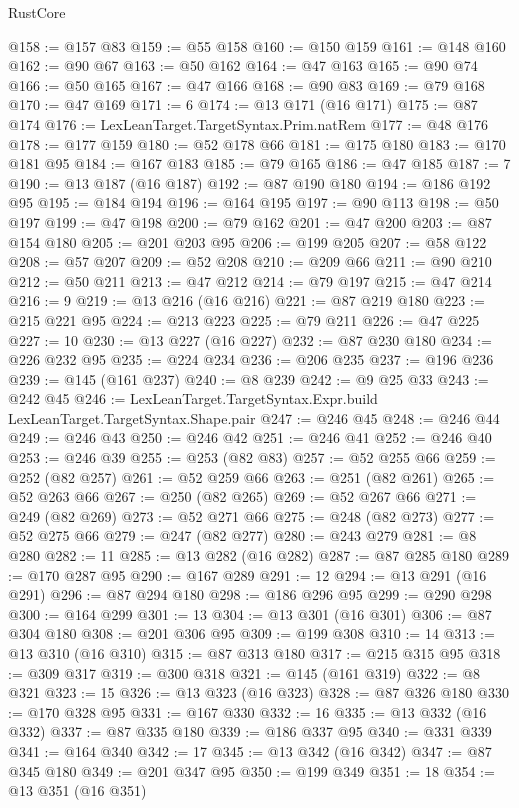 \begin{lexlean}{RustCore}
\begin{coremodule}
@158 := @157 @83
@159 := @55 @158
@160 := @150 @159
@161 := @148 @160
@162 := @90 @67
@163 := @50 @162
@164 := @47 @163
@165 := @90 @74
@166 := @50 @165
@167 := @47 @166
@168 := @90 @83
@169 := @79 @168
@170 := @47 @169
@171 := 6
@174 := @13 @171 (@16 @171)
@175 := @87 @174
@176 := LexLeanTarget.TargetSyntax.Prim.natRem
@177 := @48 @176
@178 := @177 @159
@180 := @52 @178 @66
@181 := @175 @180
@183 := @170 @181 @95
@184 := @167 @183
@185 := @79 @165
@186 := @47 @185
@187 := 7
@190 := @13 @187 (@16 @187)
@192 := @87 @190 @180
@194 := @186 @192 @95
@195 := @184 @194
@196 := @164 @195
@197 := @90 @113
@198 := @50 @197
@199 := @47 @198
@200 := @79 @162
@201 := @47 @200
@203 := @87 @154 @180
@205 := @201 @203 @95
@206 := @199 @205
@207 := @58 @122
@208 := @57 @207
@209 := @52 @208
@210 := @209 @66
@211 := @90 @210
@212 := @50 @211
@213 := @47 @212
@214 := @79 @197
@215 := @47 @214
@216 := 9
@219 := @13 @216 (@16 @216)
@221 := @87 @219 @180
@223 := @215 @221 @95
@224 := @213 @223
@225 := @79 @211
@226 := @47 @225
@227 := 10
@230 := @13 @227 (@16 @227)
@232 := @87 @230 @180
@234 := @226 @232 @95
@235 := @224 @234
@236 := @206 @235
@237 := @196 @236
@239 := @145 (@161 @237)
@240 := @8 @239
@242 := @9 @25 @33
@243 := @242 @45
@246 := LexLeanTarget.TargetSyntax.Expr.build LexLeanTarget.TargetSyntax.Shape.pair
@247 := @246 @45
@248 := @246 @44
@249 := @246 @43
@250 := @246 @42
@251 := @246 @41
@252 := @246 @40
@253 := @246 @39
@255 := @253 (@82 @83)
@257 := @52 @255 @66
@259 := @252 (@82 @257)
@261 := @52 @259 @66
@263 := @251 (@82 @261)
@265 := @52 @263 @66
@267 := @250 (@82 @265)
@269 := @52 @267 @66
@271 := @249 (@82 @269)
@273 := @52 @271 @66
@275 := @248 (@82 @273)
@277 := @52 @275 @66
@279 := @247 (@82 @277)
@280 := @243 @279
@281 := @8 @280
@282 := 11
@285 := @13 @282 (@16 @282)
@287 := @87 @285 @180
@289 := @170 @287 @95
@290 := @167 @289
@291 := 12
@294 := @13 @291 (@16 @291)
@296 := @87 @294 @180
@298 := @186 @296 @95
@299 := @290 @298
@300 := @164 @299
@301 := 13
@304 := @13 @301 (@16 @301)
@306 := @87 @304 @180
@308 := @201 @306 @95
@309 := @199 @308
@310 := 14
@313 := @13 @310 (@16 @310)
@315 := @87 @313 @180
@317 := @215 @315 @95
@318 := @309 @317
@319 := @300 @318
@321 := @145 (@161 @319)
@322 := @8 @321
@323 := 15
@326 := @13 @323 (@16 @323)
@328 := @87 @326 @180
@330 := @170 @328 @95
@331 := @167 @330
@332 := 16
@335 := @13 @332 (@16 @332)
@337 := @87 @335 @180
@339 := @186 @337 @95
@340 := @331 @339
@341 := @164 @340
@342 := 17
@345 := @13 @342 (@16 @342)
@347 := @87 @345 @180
@349 := @201 @347 @95
@350 := @199 @349
@351 := 18
@354 := @13 @351 (@16 @351)

\end{coremodule}
\end{lexlean}
